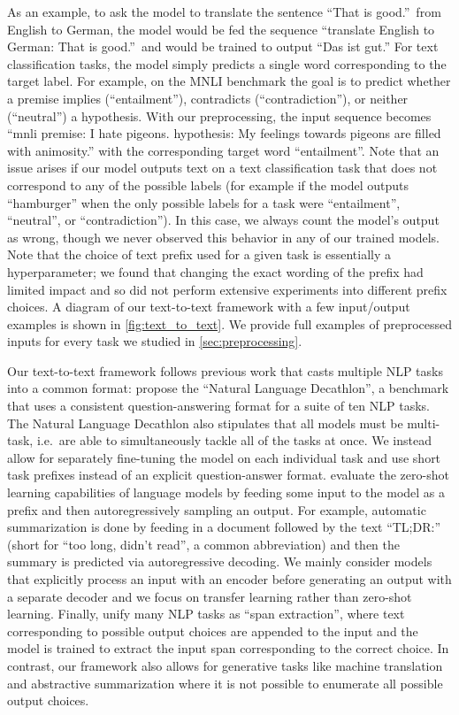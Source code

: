 As an example, to ask the model to translate the sentence ``That is good.''\ from English to German, the model would be fed the sequence ``translate English to German: That is good.''\ and would be trained to output ``Das ist gut.'' For text classification tasks, the model simply predicts a single word corresponding to the target label. For example, on the MNLI benchmark \citep{williams2017broad} the goal is to predict whether a premise implies (``entailment''), contradicts (``contradiction''), or neither (``neutral'') a hypothesis. With our preprocessing, the input sequence becomes ``mnli premise: I hate pigeons. hypothesis: My feelings towards pigeons are filled with animosity.'' with the corresponding target word ``entailment''. Note that an issue arises if our model outputs text on a text classification task that does not correspond to any of the possible labels (for example if the model outputs ``hamburger'' when the only possible labels for a task were ``entailment'', ``neutral'', or ``contradiction''). In this case, we always count the model's output as wrong, though we never observed this behavior in any of our trained models. Note that the choice of text prefix used for a given task is essentially a hyperparameter; we found that changing the exact wording of the prefix had limited impact and so did not perform extensive experiments into different prefix choices. A diagram of our text-to-text framework with a few input/output examples is shown in \ref{fig:text_to_text}.
We provide full examples of preprocessed inputs for every task we studied in \ref{sec:preprocessing}.

Our text-to-text framework follows previous work that casts multiple NLP tasks into a common format:
\citet{mccann2018natural} propose the ``Natural Language Decathlon'', a benchmark that uses a consistent question-answering format for a suite of ten NLP tasks. The Natural Language Decathlon also stipulates that all models must be multi-task, i.e.\ are able to simultaneously tackle all of the tasks at once. We instead allow for separately fine-tuning the model on each individual task and use short task prefixes instead of an explicit question-answer format.
\citet{radford2019language} evaluate the zero-shot learning capabilities of language models by feeding some input to the model as a prefix and then autoregressively sampling an output. For example, automatic summarization is done by feeding in a document followed by the text ``TL;DR:'' (short for ``too long, didn't read'', a common abbreviation) and then the summary is predicted via autoregressive decoding. We mainly consider models that explicitly process an input with an encoder before generating an output with a separate decoder and we focus on transfer learning rather than zero-shot learning. Finally, \citet{keskar2019unifying} unify many NLP tasks as ``span extraction'', where text corresponding to possible output choices are appended to the input and the model is trained to extract the input span corresponding to the correct choice. In contrast, our framework also allows for generative tasks like machine translation and abstractive summarization where it is not possible to enumerate all possible output choices.


